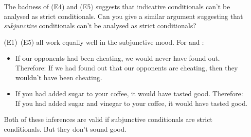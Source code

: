 \begin{exercise}
  The badness of (E4) and (E5) suggests that indicative conditionals can't be
  analysed as strict conditionals. Can you give a similar argument suggesting
  that \emph{subjunctive} conditionals can't be analysed as strict conditionals?
\end{exercise}
\begin{solution}
  (E1)--(E5) all work equally well in the subjunctive mood. For  and
  :
  \begin{itemize}
  \item If our opponents had been cheating, we would never have found out.
    Therefore: If we had found out that our opponents are cheating, then
    they wouldn't have been cheating.
  \item If you had added sugar to your coffee, it would have tasted
    good. Therefore: If you had added sugar and vinegar to your coffee, it would
    have tasted good.
  \end{itemize}
  Both of these inferences are valid if subjunctive conditionals are strict
  conditionals. But they don't sound good.
\end{solution}


  


